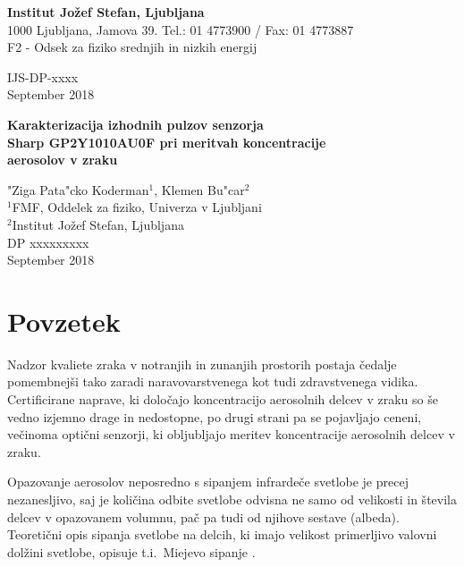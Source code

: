 \documentclass[12pt,a4paper]{article}
\begin{document}
{\Large\bfseries Institut Jožef Stefan, Ljubljana}\\
1000 Ljubljana, Jamova 39. Tel.: 01 4773900 / Fax: 01 4773887\\
F2 - Odsek za fiziko srednjih in nizkih energij

\vspace{15ex}
\hspace*{\fill}IJS-DP-xxxx\\[5ex]
\hspace*{\fill}September 2018\\

\vspace{10ex}
\begin{center}
{\large\bfseries
Karakterizacija izhodnih pulzov senzorja\\ Sharp GP2Y1010AU0F pri meritvah koncentracije\\ aerosolov v zraku
}
\vspace{5ex}

"Ziga Pata"cko Koderman$^1$, Klemen Bu"car$^2$\\[5mm]
$^1$FMF, Oddelek za fiziko, Univerza v Ljubljani\\
$^2$Institut Jožef Stefan, Ljubljana\\[8ex]
DP xxxxxxxxx\\[2ex]
September 2018
\end{center}


\thispagestyle{empty}
\newpage
\tableofcontents
\pagebreak

\section{Povzetek}

Nadzor kvaliete zraka v notranjih in zunanjih prostorih postaja čedalje pomembnejši tako zaradi naravovarstvenega kot tudi zdravstvenega vidika. Certificirane naprave, ki določajo koncentracijo aerosolnih delcev v zraku so še vedno izjemno drage in nedostopne, po drugi strani pa se pojavljajo ceneni, večinoma optični senzorji, ki obljubljajo meritev koncentracije aerosolnih delcev v zraku.

Opazovanje aerosolov neposredno s sipanjem infrardeče svetlobe je precej nezanesljivo, saj je količina odbite svetlobe odvisna ne samo od velikosti in števila delcev v opazovanem volumnu, pač pa tudi od njihove sestave (albeda). Teoretični opis sipanja svetlobe na delcih, ki imajo velikost primerljivo valovni dolžini svetlobe, opisuje t.i.~Miejevo sipanje \cite{mie-scattering}.
\end{document}
